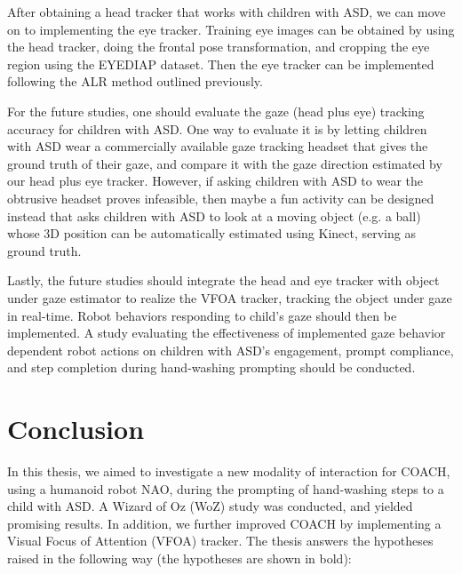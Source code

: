 \documentclass{ut-thesis}
\begin{document}
After obtaining a head tracker that works with children with ASD, we can move on to implementing the eye tracker.  Training eye images can be obtained by using the head tracker, doing the frontal pose transformation, and cropping the eye region using the EYEDIAP dataset.  Then the eye tracker can be implemented following the ALR method outlined previously.

For the future studies, one should evaluate the gaze (head plus eye) tracking accuracy for children with ASD.  One way to evaluate it is by letting children with ASD wear a commercially available gaze tracking headset that gives the ground truth of their gaze, and compare it with the gaze direction estimated by our head plus eye tracker.  However, if asking children with ASD to wear the obtrusive headset proves infeasible, then maybe a fun activity can be designed instead that asks children with ASD to look at a moving object (e.g. a ball) whose 3D position can be automatically estimated using Kinect, serving as ground truth.

Lastly, the future studies should integrate the head and eye tracker with object under gaze estimator to realize the VFOA tracker, tracking the object under gaze in real-time.  Robot behaviors responding to child's gaze should then be implemented.  A study evaluating the effectiveness of implemented gaze behavior dependent robot actions on children with ASD's engagement, prompt compliance, and step completion during hand-washing prompting should be conducted.
\chapter{Conclusion}
In this thesis, we aimed to investigate a new modality of interaction for COACH, using a humanoid robot NAO, during the prompting of hand-washing steps to a child with ASD.  A Wizard of Oz (WoZ) study was conducted, and yielded promising results.  In addition, we further improved COACH by implementing a Visual Focus of Attention (VFOA) tracker.  The thesis answers the hypotheses raised in the following way (the hypotheses are shown in bold):
\end{document}
